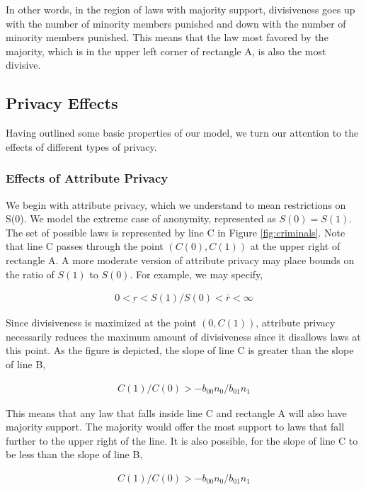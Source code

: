 In other words, in the region of laws with majority support, divisiveness goes up with the number of minority members punished and down with the number of minority members punished.  This means that the law most favored by the majority, which is in the upper left corner of rectangle A, is also the most divisive.

\subsection{Privacy Effects}
Having outlined some basic properties of our model, we turn our attention to the effects of different types of privacy.  

\subsubsection{Effects of Attribute Privacy}
We begin with attribute privacy, which we understand to mean restrictions on S(0).  We model the extreme case of anonymity, represented as $S(0) = S(1)$.  The set of possible laws is represented by line C in Figure \ref{fig:criminals}.  Note that line C passes through the point $ \left(C(0), C(1) \right)$ at the upper right of rectangle A.  A more moderate version of attribute privacy may place bounds on the ratio of $S(1)$ to $S(0)$.  For example, we may specify,

\begin{align}
0 < \underbar r < S(1) /S(0) < \bar r < \infty
\end{align}

Since divisiveness is maximized at the point $ \left(0, C(1) \right)$, attribute privacy necessarily reduces the maximum amount of divisiveness since it disallows laws at this point.  As the figure is depicted, the slope of line C is greater than the slope of line B,

\begin{align}
C(1)/C(0) > - b_{00}n_0 / b_{01}n_1 
\end{align}

This means that any law that falls inside line C and rectangle A will also have majority support.  The majority would offer the most support to laws that fall further to the upper right of the line.  It is also possible, for the slope of line C to be less than the slope of line B,

\begin{align}
C(1)/C(0) > - b_{00}n_0 / b_{01}n_1 
\end{align}

